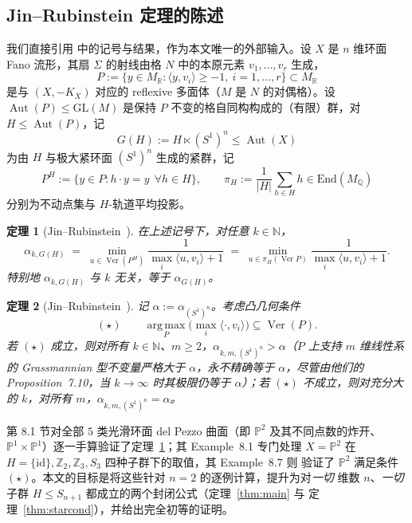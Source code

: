 \documentclass[11pt,a4paper]{article}
\newtheorem{theorem}{定理}[section]
\theoremstyle{definition}
\theoremstyle{remark}
\DeclareMathOperator{\Aut}{Aut}
\DeclareMathOperator{\Ver}{Ver}
\newcommand{\Q}{\mathbb{Q}}
\newcommand{\R}{\mathbb{R}}
\newcommand{\N}{\mathbb{N}}
\newcommand{\PP}{\mathbb{P}}
\begin{document}
\subsection{Jin--Rubinstein 定理的陈述}

我们直接引用 \cite{JR2025} 中的记号与结果，作为本文唯一的外部输入。设 $X$ 是 $n$ 维环面 Fano
流形，其扇 $\Sigma$ 的射线由格 $N$ 中的本原元素 $v_1,\dots,v_r$ 生成，
\[
  P := \{y \in M_\R : \langle y, v_i \rangle \ge -1,\ i = 1,\dots, r\} \subset M_\R
\]
是与 $(X, -K_X)$ 对应的 reflexive 多面体（$M$ 是 $N$ 的对偶格）。设 $\Aut(P) \le \mathrm{GL}(M)$
是保持 $P$ 不变的格自同构构成的（有限）群，对 $H \le \Aut(P)$，记
\[
  G(H) := H \ltimes (S^1)^n \le \Aut(X)
\]
为由 $H$ 与极大紧环面 $(S^1)^n$ 生成的紧群，记
\[
  P^H := \{y \in P : h\cdot y = y\ \ \forall h \in H\}, \qquad
  \pi_H := \frac{1}{|H|}\sum_{h \in H} h \in \mathrm{End}(M_\Q)
\]
分别为不动点集与 $H$-轨道平均投影。

\begin{theorem}[Jin--Rubinstein~{\cite[Theorem~1.4]{JR2025}}]\label{thm:JR14}
在上述记号下，对任意 $k \in \N$，
\[
  \alpha_{k,G(H)} \;=\; \min_{u \in \Ver(P^H)} \frac{1}{\max_i \langle u, v_i\rangle + 1}
  \;=\; \min_{u \in \pi_H(\Ver P)} \frac{1}{\max_i \langle u, v_i\rangle + 1}.
\]
特别地 $\alpha_{k,G(H)}$ 与 $k$ 无关，等于 $\alpha_{G(H)}$。
\end{theorem}

\begin{theorem}[Jin--Rubinstein~{\cite[Theorem~1.6]{JR2025}}]\label{thm:JR16}
记 $\alpha := \alpha_{(S^1)^n}$。考虑凸几何条件
\[
  (\star) \qquad \operatorname*{arg\,max}_{P} \big(\max_i \langle \cdot, v_i \rangle\big) \subseteq \Ver(P).
\]
若 $(\star)$ 成立，则对所有 $k \in \N$、$m \ge 2$，$\alpha_{k,m,(S^1)^n} > \alpha$（$P$ 上支持
$m$ 维线性系的 Grassmannian 型不变量严格大于 $\alpha$，永不精确等于 $\alpha$，尽管由他们的
Proposition~7.10，当 $k\to\infty$ 时其极限仍等于 $\alpha$）；若 $(\star)$ 不成立，则对充分大的
$k$，对所有 $m$，$\alpha_{k,m,(S^1)^n} = \alpha$。
\end{theorem}

\cite{JR2025} 第 8.1 节对全部 $5$ 类光滑环面 del Pezzo 曲面（即 $\PP^2$ 及其不同点数的炸开、
$\PP^1\times\PP^1$）逐一手算验证了定理~\ref{thm:JR14}；其 Example~8.1 专门处理 $X = \PP^2$
在 $H = \{\mathrm{id}\}, \mathbb{Z}_2, \mathbb{Z}_3, S_3$ 四种子群下的取值，其 Example~8.7 则
验证了 $\PP^2$ 满足条件 $(\star)$。本文的目标是将这些针对 $n=2$ 的逐例计算，提升为对\emph{一切}
维数 $n$、\emph{一切}子群 $H \le S_{n+1}$ 都成立的两个封闭公式（定理~\ref{thm:main} 与
定理~\ref{thm:starcond}），并给出完全初等的证明。
\end{document}
